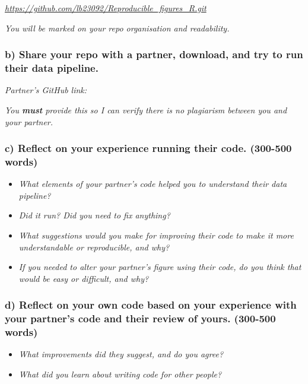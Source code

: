 \documentclass[
]{article}
\begin{document}
\emph{\url{https://github.com/lb23092/Reproducible_figures_R.git}}

\emph{You will be marked on your repo organisation and readability.}

\hypertarget{b-share-your-repo-with-a-partner-download-and-try-to-run-their-data-pipeline.}{%
\subsubsection{b) Share your repo with a partner, download, and try to
run their data
pipeline.}\label{b-share-your-repo-with-a-partner-download-and-try-to-run-their-data-pipeline.}}

\emph{Partner's GitHub link:}

\emph{You \textbf{must} provide this so I can verify there is no
plagiarism between you and your partner.}

\hypertarget{c-reflect-on-your-experience-running-their-code.-300-500-words}{%
\subsubsection{c) Reflect on your experience running their code.
(300-500
words)}\label{c-reflect-on-your-experience-running-their-code.-300-500-words}}

\begin{itemize}
\item
  \emph{What elements of your partner's code helped you to understand
  their data pipeline?}
\item
  \emph{Did it run? Did you need to fix anything?}
\item
  \emph{What suggestions would you make for improving their code to make
  it more understandable or reproducible, and why?}
\item
  \emph{If you needed to alter your partner's figure using their code,
  do you think that would be easy or difficult, and why?}
\end{itemize}

\hypertarget{d-reflect-on-your-own-code-based-on-your-experience-with-your-partners-code-and-their-review-of-yours.-300-500-words}{%
\subsubsection{d) Reflect on your own code based on your experience with
your partner's code and their review of yours. (300-500
words)}\label{d-reflect-on-your-own-code-based-on-your-experience-with-your-partners-code-and-their-review-of-yours.-300-500-words}}

\begin{itemize}
\item
  \emph{What improvements did they suggest, and do you agree?}
\item
  \emph{What did you learn about writing code for other people?}
\end{itemize}
\end{document}

